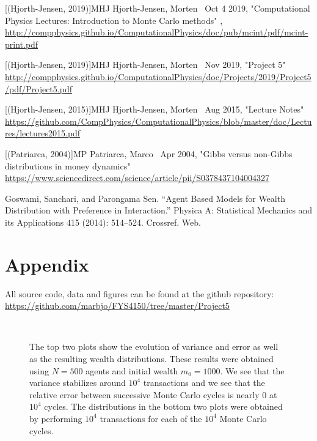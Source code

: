 \documentclass{emulateapj}
\begin{document}
\begin{thebibliography}{}

[(Hjorth-Jensen, 2019)]{MHJ} Hjorth-Jensen, Morten \, Oct 4 2019, "Computational Physics Lectures: Introduction to Monte Carlo methods" , \url{http://compphysics.github.io/ComputationalPhysics/doc/pub/mcint/pdf/mcint-print.pdf}

[(Hjorth-Jensen, 2019)]{MHJ} Hjorth-Jensen, Morten \, Nov 2019, "Project 5"
\url{http://compphysics.github.io/ComputationalPhysics/doc/Projects/2019/Project5/pdf/Project5.pdf}

[(Hjorth-Jensen, 2015)]{MHJ} Hjorth-Jensen, Morten \, Aug 2015, "Lecture Notes"
\url{https://github.com/CompPhysics/ComputationalPhysics/blob/master/doc/Lectures/lectures2015.pdf}

[(Patriarca, 2004)]{MP} Patriarca, Marco \, Apr 2004, 
"Gibbs versus non-Gibbs distributions in money dynamics"
\url{https://www.sciencedirect.com/science/article/pii/S0378437104004327}

Goswami, Sanchari, and Parongama Sen. “Agent Based Models for Wealth Distribution with Preference in Interaction.” Physica A: Statistical Mechanics and its Applications 415 (2014): 514–524. Crossref. Web.

\end{thebibliography}

\section{Appendix}
All source code, data and figures can be found at the github repository: \url{https://github.com/marbjo/FYS4150/tree/master/Project5}

\pagebreak

\begin{figure*}
    \\
    \caption{The top two plots show the evolution of variance and error as well as the resulting wealth distributions. These results were obtained using $N=500$ agents and initial wealth $m_0=1000$. We see that the variance stabilizes around $10^4$ transactions and we see that the relative error between successive Monte Carlo cycles is nearly 0 at $10^4$ cycles. The distributions in the bottom two plots were obtained by performing $10^4$ transactions for each of the $10^4$ Monte Carlo cycles.}
    \label{fig1}
\end{figure*}
\end{document}
